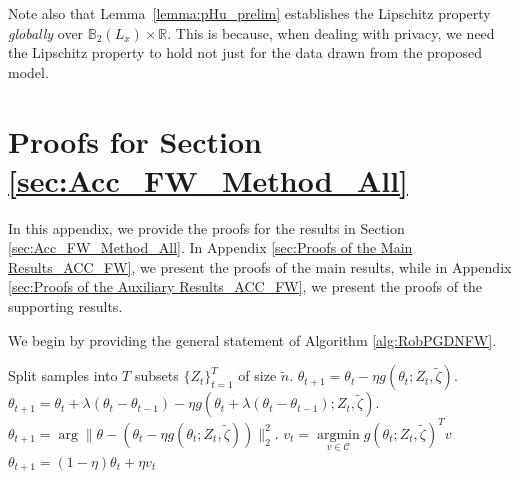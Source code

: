 \documentclass{article}
\begin{document}
Note also that Lemma~\ref{lemma:pHu_prelim} establishes the Lipschitz property \emph{globally} over $\mathbb{B}_2(L_x) \times \mathbb{R}$. This is because, when dealing with privacy, we need the Lipschitz property to hold not just for the data drawn from the proposed model.


\section{Proofs for Section \ref{sec:Acc_FW_Method_All}}

In this appendix, we provide the proofs for the results in Section \ref{sec:Acc_FW_Method_All}. In Appendix \ref{sec:Proofs of the Main Results_ACC_FW}, we present the proofs of the main results, while in Appendix \ref{sec:Proofs of the Auxiliary Results_ACC_FW}, we present the proofs of the supporting results.

We begin by providing the general statement of Algorithm \ref{alg:RobPGDNFW}.

\begin{algorithm}
\caption{Robust Gradient Descent}
\label{alg:RobPGDNFW}
\begin{algorithmic}[1]
    \State Split samples into $T$ subsets $\{Z_t\}_{t=1}^T$ of size $\widetilde{n}$.
            \State $\theta_{t+1} =  \theta_t - \eta g(\theta_t; Z_t, \widetilde{\zeta})$.
        \EndIf
            \State $\theta_{t+1} =  \theta_t + \lambda(\theta_t - \theta_{t-1}) - \eta g(\theta_t + \lambda(\theta_t - \theta_{t-1}); Z_t, \widetilde{\zeta})$.
        \EndIf
        \EndIf
            \State $\theta_{t+1} = \mathop{\arg \min\limits_{\theta \in \mathcal{C}}} \| \theta - \left( \theta_t - \eta g(\theta_t; Z_t, \widetilde{\zeta}) \right) \|_2^2$.
        \EndIf 
        \State $v_t = \mathop{\arg \min}\limits_{v \in \mathcal{C}} g(\theta_t; Z_t, \widetilde{\zeta})^Tv$
        \State $\theta_{t + 1} = (1 - \eta)\theta_t + \eta v_t$
        \EndIf
    
    \EndIf
    
    \EndFor
\EndFunction
\end{algorithmic}
\end{algorithm}
\end{document}
